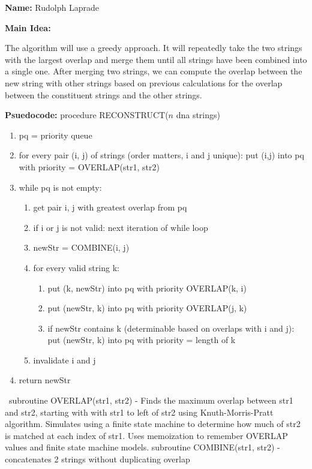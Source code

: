 \documentclass[11pt]{article}
\begin{document}
\noindent
\textbf{Name:}  Rudolph Laprade \newline

\noindent
\textbf{Main Idea:} \newline

\indent The algorithm will use a greedy approach. It will repeatedly take the two strings with the largest overlap and merge them until all strings have been combined into a single one. After merging two strings, we can compute the overlap between the new string with other strings based on previous calculations for the overlap between the constituent strings and the other strings.\newline \newline

\noindent
\textbf{Psuedocode:} \newline
procedure RECONSTRUCT($n$ dna strings)
\begin{enumerate}
    \item pq = priority queue
    \item for every pair (i, j) of strings (order matters, i and j unique):  put (i,j) into pq with priority = OVERLAP(str1, str2)
    \item while pq is not empty:
    \begin{enumerate}
        \item get pair {i, j} with greatest overlap from pq
        \item if i or j is not valid: next iteration of while loop
        \item newStr = COMBINE(i, j)
        \item for every valid string k:
        \begin{enumerate}
            \item put (k, newStr) into pq with priority OVERLAP(k, i) 
            \item put (newStr, k) into pq with priority OVERLAP(j, k) 
            \item if newStr contains k (determinable based on overlaps with i and j): put (newStr, k) into pq with priority = length of k
        \end{enumerate}
        \item invalidate i and j
    \end{enumerate}
    \item return newStr
\end{enumerate}
\ \newline subroutine OVERLAP(str1, str2) - Finds the maximum overlap between str1 and str2, starting with with str1 to left of str2 using Knuth-Morris-Pratt algorithm. Simulates using a finite state machine to determine how much of str2 is matched at each index of str1. Uses memoization to remember OVERLAP values and finite state machine models. \newline \newline
subroutine COMBINE(str1, str2) - concatenates 2 strings without duplicating overlap \newline \newline
\end{document}
